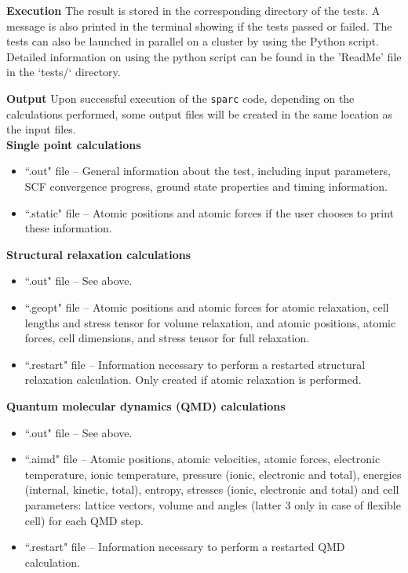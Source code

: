 \begin{frame}{\textbf{Execution}}
  The result is stored in the corresponding directory of the tests. A message is also printed in the terminal showing if the tests passed or failed. The tests can also be launched in parallel on a cluster by using the Python script. Detailed information on using the python script can be found in the 'ReadMe' file in the `tests/` directory.
  \end{frame}
  
  
  \begin{frame}{\textbf{Output}} \label{Output}
  Upon successful execution of the \texttt{sparc} code, depending on the calculations performed, some output files will be created in the same location as the input files. \\
  
  \textbf{Single point calculations}  \\
  \begin{itemize}
    \item ``.out" file -- General information about the test, including input parameters, SCF convergence progress, ground state properties and timing information.
    \item ``.static" file -- Atomic positions and atomic forces if the user chooses to print these information.
  \end{itemize}
  
  \textbf{Structural relaxation calculations}  \\
  \begin{itemize}
    \item ``.out" file -- See above.
    \item ``.geopt" file -- Atomic positions and atomic forces for atomic relaxation, cell lengths and stress tensor for volume relaxation, and atomic positions, atomic forces, cell dimensions, and stress tensor for full relaxation.
    \item ``.restart" file -- Information necessary to perform a restarted structural relaxation calculation. Only created if atomic relaxation is performed.
  \end{itemize}
  
  \textbf{Quantum molecular dynamics (QMD) calculations}  \\
  \begin{itemize}
    \item ``.out" file -- See above.
    \item ``.aimd" file -- Atomic positions, atomic velocities, atomic forces, electronic temperature, ionic temperature, pressure (ionic, electronic and total), energies (internal, kinetic, total), entropy, stresses (ionic, electronic and total) and cell parameters: lattice vectors, volume and angles (latter 3 only in case of flexible cell) for each QMD step.
    \item ``.restart" file -- Information necessary to perform a restarted QMD calculation. 
  \end{itemize}
  
  \end{frame}
  
